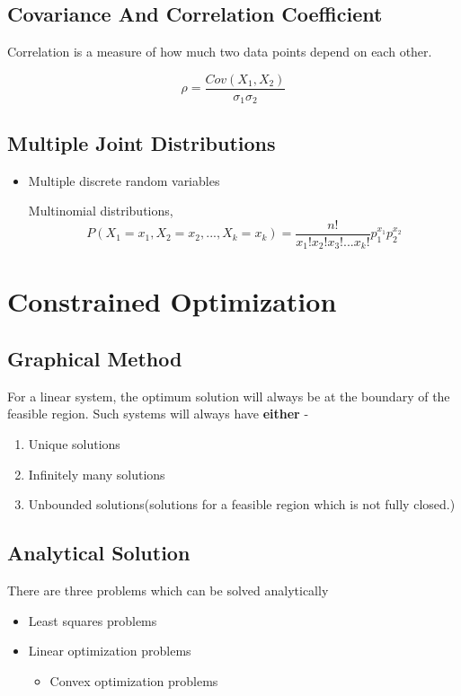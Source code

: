\documentclass[11pt]{report}
\begin{document}
\section{Covariance And Correlation Coefficient}
\label{sec:org1323c4c}

Correlation is a measure of how much two data points depend on each other.

$$\rho = \frac{Cov(X_1,X_2)}{\sigma_1 \sigma_2}$$
\section{Multiple Joint Distributions}
\label{sec:org2542038}

\begin{itemize}
\item Multiple discrete random variables

Multinomial distributions, $$P(X_1 = x_{1}, X_2 = x_2, ... , X_k = x_k) = \frac{n!}{x_1! x_2! x_3! ... x_k!} p_1^{x_1}p_2^{x_2}$$
\end{itemize}
\chapter{Constrained Optimization}
\label{sec:org1a78328}
\section{Graphical Method}
\label{sec:org872ba81}
For a linear system, the optimum solution will always be at the boundary of the feasible region. Such systems will always have \textbf{either} -
\begin{enumerate}
\item Unique solutions
\item Infinitely many solutions
\item Unbounded solutions(solutions for a feasible region which is not fully closed.)
\end{enumerate}
\section{Analytical Solution}
\label{sec:org6b85623}
There are three problems which can be solved analytically
\begin{itemize}
\item Least squares problems
\item Linear optimization problems
\begin{itemize}
\item Convex optimization problems
\end{itemize}
\end{itemize}
\end{document}
